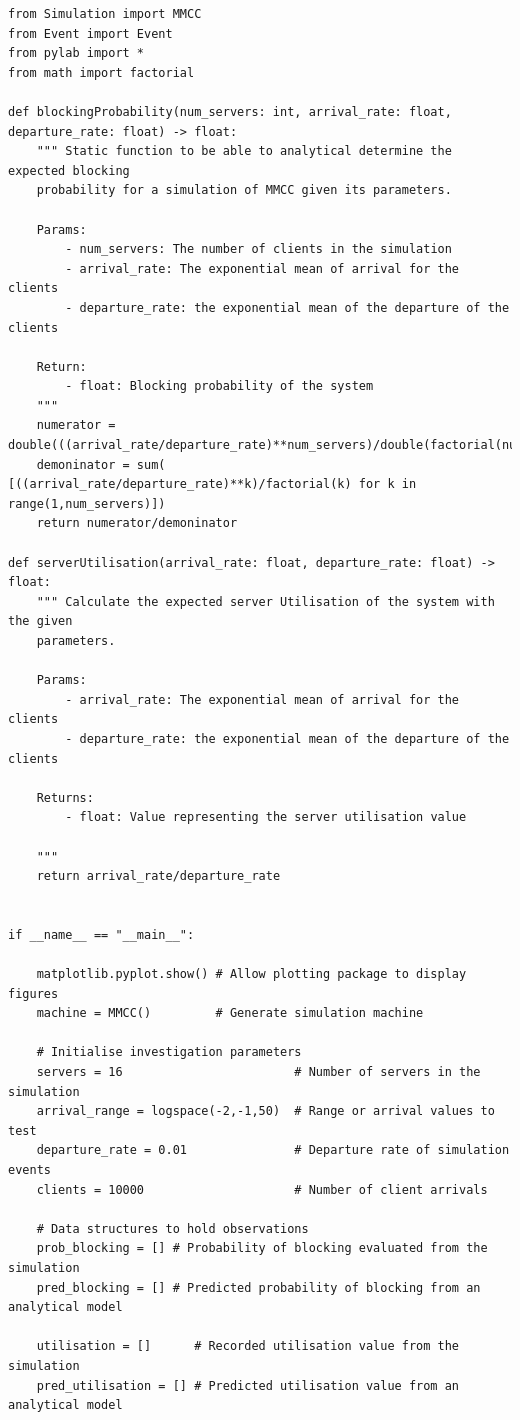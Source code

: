 \documentclass{ecmm427_assignment}
\begin{document}
\begin{verbatim}
from Simulation import MMCC
from Event import Event
from pylab import *
from math import factorial

def blockingProbability(num_servers: int, arrival_rate: float, departure_rate: float) -> float:
    """ Static function to be able to analytical determine the expected blocking
    probability for a simulation of MMCC given its parameters.

    Params:
        - num_servers: The number of clients in the simulation
        - arrival_rate: The exponential mean of arrival for the clients
        - departure_rate: the exponential mean of the departure of the clients

    Return:
        - float: Blocking probability of the system
    """
    numerator = double(((arrival_rate/departure_rate)**num_servers)/double(factorial(num_servers)))
    demoninator = sum( [((arrival_rate/departure_rate)**k)/factorial(k) for k in range(1,num_servers)])
    return numerator/demoninator

def serverUtilisation(arrival_rate: float, departure_rate: float) -> float:
    """ Calculate the expected server Utilisation of the system with the given
    parameters.

    Params:
        - arrival_rate: The exponential mean of arrival for the clients
        - departure_rate: the exponential mean of the departure of the clients

    Returns:
        - float: Value representing the server utilisation value

    """
    return arrival_rate/departure_rate


if __name__ == "__main__":

    matplotlib.pyplot.show() # Allow plotting package to display figures
    machine = MMCC()         # Generate simulation machine

    # Initialise investigation parameters
    servers = 16                        # Number of servers in the simulation
    arrival_range = logspace(-2,-1,50)  # Range or arrival values to test
    departure_rate = 0.01               # Departure rate of simulation events
    clients = 10000                     # Number of client arrivals

    # Data structures to hold observations
    prob_blocking = [] # Probability of blocking evaluated from the simulation
    pred_blocking = [] # Predicted probability of blocking from an analytical model

    utilisation = []      # Recorded utilisation value from the simulation
    pred_utilisation = [] # Predicted utilisation value from an analytical model


\end{verbatim}
\end{document}
